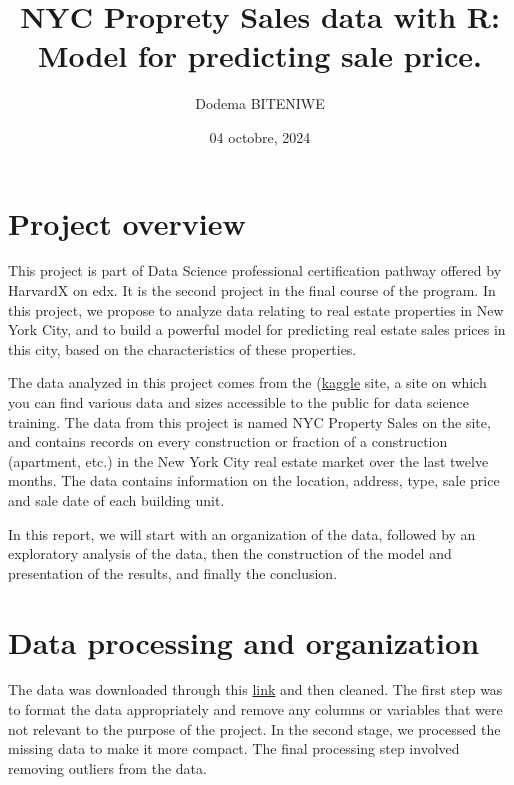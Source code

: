 \documentclass[
]{article}
\title{NYC Proprety Sales data with R: Model for predicting sale price.}
\author{Dodema BITENIWE}
\date{04 octobre, 2024}
\begin{document}
\maketitle

{
\hypersetup{linkcolor=}
\setcounter{tocdepth}{2}
\tableofcontents
}
\newpage

\hypertarget{project-overview}{%
\section{Project overview}\label{project-overview}}

This project is part of Data Science professional certification pathway offered by HarvardX on edx. It is the second project in the final course of the program. In this project, we propose to analyze data relating to real estate properties in New York City, and to build a powerful model for predicting real estate sales prices in this city, based on the characteristics of these properties.

The data analyzed in this project comes from the (\href{https://www.kaggle.com/datasets}{kaggle} site, a site on which you can find various data and sizes accessible to the public for data science training. The data from this project is named NYC Property Sales on the site, and contains records on every construction or fraction of a construction (apartment, etc.) in the New York City real estate market over the last twelve months. The data contains information on the location, address, type, sale price and sale date of each building unit.

In this report, we will start with an organization of the data, followed by an exploratory analysis of the data, then the construction of the model and presentation of the results, and finally the conclusion.

\hypertarget{data-processing-and-organization}{%
\section{Data processing and organization}\label{data-processing-and-organization}}

The data was downloaded through this \href{https://www.kaggle.com/datasets/new-york-city/nyc-property-sales}{link} and then cleaned. The first step was to format the data appropriately and remove any columns or variables that were not relevant to the purpose of the project. In the second stage, we processed the missing data to make it more compact. The final processing step involved removing outliers from the data.
\end{document}
